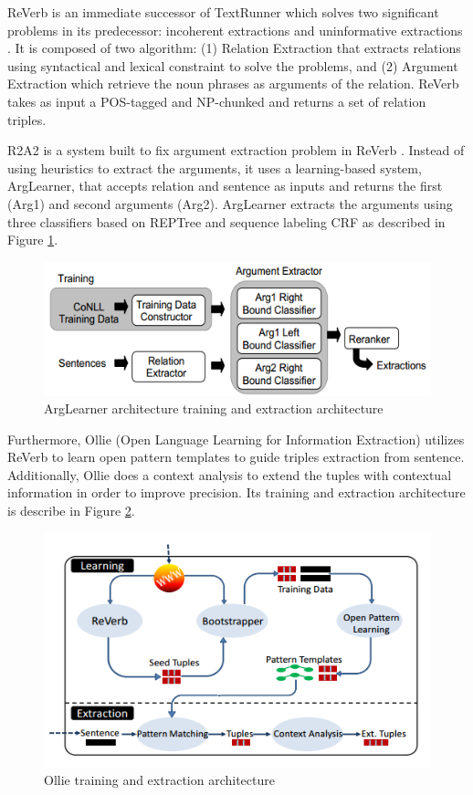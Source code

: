 \documentclass[conference,compsoc]{IEEEtran}
\begin{document}
ReVerb is an immediate successor of TextRunner which solves two significant problems in its predecessor: incoherent extractions and uninformative extractions \cite{fader2011identifying}. It is composed of two algorithm: (1) Relation Extraction that extracts relations using syntactical and lexical constraint to solve the problems, and (2) Argument Extraction which retrieve the noun phrases as arguments of the relation. ReVerb takes as input a POS-tagged and NP-chunked and returns a set of relation triples.

R2A2 is a system built to fix argument extraction problem in ReVerb \cite{etzioni2011open}. Instead of using heuristics to extract the arguments, it uses a learning-based system, ArgLearner, that accepts relation and sentence as inputs and returns the first (Arg1) and second arguments (Arg2). ArgLearner extracts the arguments using three classifiers based on REPTree and sequence labeling CRF as described in Figure \ref{fig_arglearner_architecture}.

\begin{figure}
\centering
\includegraphics[scale=0.3]{arglearner_architecture}
\caption{ArgLearner architecture training and extraction architecture}
\label{fig_arglearner_architecture}
\end{figure}

Furthermore, Ollie (Open Language Learning for Information Extraction) utilizes ReVerb to learn open pattern templates to guide triples extraction from sentence. Additionally, Ollie does a context analysis to extend the tuples with contextual information in order to improve precision. Its training and extraction architecture is describe in Figure \ref{fig_ollie_architecture}.

\begin{figure}
\centering
\includegraphics[scale=0.3]{ollie_architecture}
\caption{Ollie training and extraction architecture}
\label{fig_ollie_architecture}
\end{figure}
\end{document}
